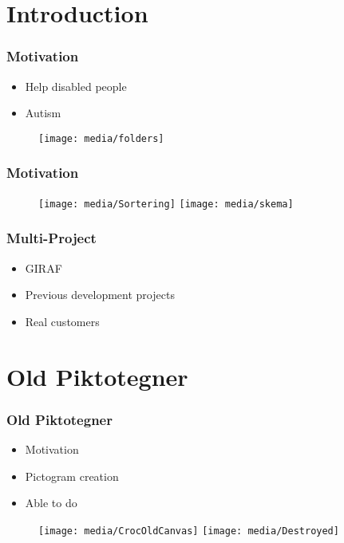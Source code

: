 


\section{Introduction}
\begin{frame}
	\frametitle{Motivation}
	\begin{itemize}
		\item Help disabled people
		\item Autism
	\end{itemize}
	\begin{figure}
		\texttt{[image: media/folders]}
	\end{figure}
\end{frame}

\begin{frame}
	\frametitle{Motivation}
	\begin{figure}
		\texttt{[image: media/Sortering]}		
		\hfill
		\texttt{[image: media/skema]}
	\end{figure}
\end{frame}

\begin{frame}
	\frametitle{Multi-Project}
	\begin{itemize}
		\item GIRAF
		\item Previous development projects
		\item Real customers
	\end{itemize}
\end{frame}
	
	
	
\section{Old Piktotegner}
\begin{frame}
	\frametitle{Old Piktotegner}
	\begin{itemize}
		\item Motivation
		\item Pictogram creation
		\item Able to do
	\end{itemize}
	\begin{figure}
		\texttt{[image: media/CrocOldCanvas]}
		\hfill
		\texttt{[image: media/Destroyed]}
	\end{figure}
\end{frame}